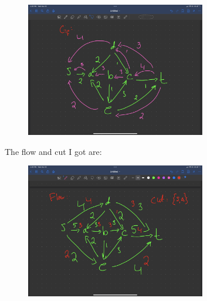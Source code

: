 \documentclass[12pt]{article}
\theoremstyle{definitionstyle}
\begin{document}
    \begin{figure}[H]
        \centering
        \includegraphics[width=0.7\textwidth]{residual.png}
    \end{figure}
    The flow and cut I got are:

    \begin{figure}[H]
        \centering
        \includegraphics[width=0.7\textwidth]{flow_cut.png}
    \end{figure}
\end{document}
